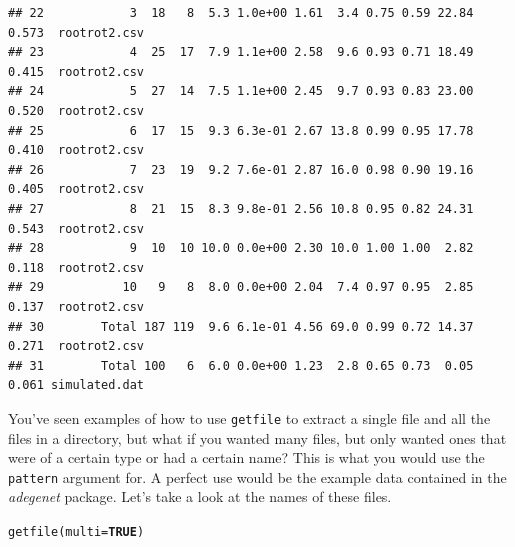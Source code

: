 \documentclass[letterpaper]{article}\usepackage[]{graphicx}\usepackage[]{color}
\makeatletter
\newcommand{\hlnum}[1]{\textcolor[rgb]{0.502,0,0.502}{\textbf{#1}}}%
\newcommand{\hlstd}[1]{\textcolor[rgb]{0,0,0}{#1}}%
\newcommand{\hlkwc}[1]{\textcolor[rgb]{0,0.502,0.753}{#1}}%
\newcommand{\hlkwd}[1]{\textcolor[rgb]{0,0.267,0.4}{#1}}%
\newenvironment{kframe}{%
 \def\at@end@of@kframe{}%
 \ifinner\ifhmode%
  \def\at@end@of@kframe{\end{minipage}}%
  \begin{minipage}{\columnwidth}%
 \fi\fi%
 \def\FrameCommand##1{\hskip\@totalleftmargin \hskip-\fboxsep
 \colorbox{shadecolor}{##1}\hskip-\fboxsep
     \hskip-\linewidth \hskip-\@totalleftmargin \hskip\columnwidth}%
 \MakeFramed {\advance\hsize-\width
   \@totalleftmargin\z@ \linewidth\hsize
   \@setminipage}}%
 {\par\unskip\endMakeFramed%
 \at@end@of@kframe}
\newenvironment{knitrout}{}{} %
\makeatother
\begin{document}
\begin{knitrout}
\begin{kframe}
\begin{verbatim}
## 22            3  18   8  5.3 1.0e+00 1.61  3.4 0.75 0.59 22.84 0.573  rootrot2.csv
## 23            4  25  17  7.9 1.1e+00 2.58  9.6 0.93 0.71 18.49 0.415  rootrot2.csv
## 24            5  27  14  7.5 1.1e+00 2.45  9.7 0.93 0.83 23.00 0.520  rootrot2.csv
## 25            6  17  15  9.3 6.3e-01 2.67 13.8 0.99 0.95 17.78 0.410  rootrot2.csv
## 26            7  23  19  9.2 7.6e-01 2.87 16.0 0.98 0.90 19.16 0.405  rootrot2.csv
## 27            8  21  15  8.3 9.8e-01 2.56 10.8 0.95 0.82 24.31 0.543  rootrot2.csv
## 28            9  10  10 10.0 0.0e+00 2.30 10.0 1.00 1.00  2.82 0.118  rootrot2.csv
## 29           10   9   8  8.0 0.0e+00 2.04  7.4 0.97 0.95  2.85 0.137  rootrot2.csv
## 30        Total 187 119  9.6 6.1e-01 4.56 69.0 0.99 0.72 14.37 0.271  rootrot2.csv
## 31        Total 100   6  6.0 0.0e+00 1.23  2.8 0.65 0.73  0.05 0.061 simulated.dat
\end{verbatim}
\end{kframe}
\end{knitrout}


You've seen examples of how to use \texttt{getfile} to extract a single file and all the files in a directory, but what if you wanted many files, but only wanted ones that were of a certain type or had a certain name? This is what you would use the \texttt{pattern} argument for.
A perfect use would be the example data contained in the \textit{adegenet} package. Let's take a look at the names of these files.
\begin{center}
\end{center}
\begin{knitrout}\footnotesize
{}\color{fgcolor}\begin{kframe}
\begin{alltt}
\hlkwd{getfile}\hlstd{(}\hlkwc{multi} \hlstd{=} \hlnum{TRUE}\hlstd{)}
\end{alltt}
\end{kframe}
\end{knitrout}
\end{document}
